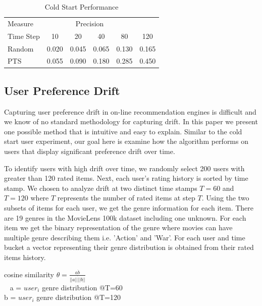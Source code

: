 \documentclass{article}
\begin{document}
\begin{table}[ht]
\caption{Cold Start Performance}
\label{sample-table}
\vskip 0.15in
\begin{center}
\begin{small}
\begin{sc}
\begin{tabular}{lccccc}
\toprule
Measure & \multicolumn{4}{c}{Precision}\\
Time Step  & 10     & 20     & 40   & 80    & 120 \\
\midrule
Random  &  0.020 & 0.045 & 0.065 & 0.130 & 0.165 \\
PTS     &  0.055 & 0.090 & 0.180 & 0.285 & 0.450 \\
\bottomrule
\end{tabular}
\end{sc}
\end{small}
\end{center}
\vskip -0.1in
\end{table}

\subsection{User Preference Drift}

Capturing user preference drift in on-line recommendation engines is difficult and we know of no standard methodology for capturing drift. In this paper we present one possible method that is intuitive and easy to explain. Similar to the cold start user experiment, our goal here is examine how the algorithm performs on users that display significant preference drift over time.  

To identify users with high drift over time, we randomly select 200 users with greater than 120 rated items. Next, each user's rating history is sorted by time stamp. We chosen to analyze drift at two distinct time stamps $T=60$ and $T=120$ where $T$ represents the number of rated items at step $T$. Using the two subsets of items for each user, we get the genre information for each item. There are 19 genres in the MovieLens 100k dataset including one unknown. For each item we get the binary representation of the genre where movies can have multiple genre describing them i.e. 'Action' and 'War'. For each user and time bucket a vector representing their genre distribution is obtained from their rated items history. 

\begin{center}
cosine similarity $\theta = \frac{a \dot b}{||a|| \dot ||b||}$ \\
\ \newline
a = $user_i$ genre distribution @T=60 \\
b = $user_i$ genre distribution @T=120 \\
\end{center}
\end{document}
